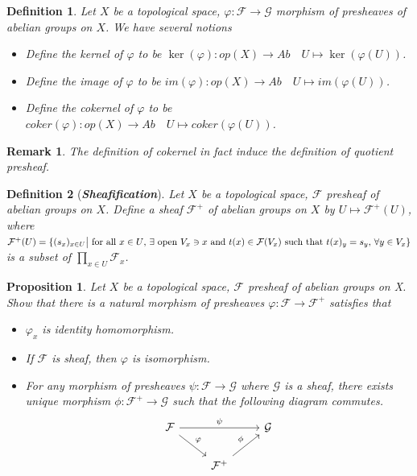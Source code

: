 \documentclass{ctexart}
\newtheorem{definition}{Definition}[section]
\newtheorem{remark}{Remark}[section]
\newtheorem{proposition}{Proposition}[section]
\begin{document}
\begin{definition}
    Let $X$ be a topological space, $\varphi: \mathcal{F} \longrightarrow \mathcal{G}$ morphism of presheaves of abelian groups on $X$.
    We have several notions
    \begin{itemize}
        \item Define the kernel of $\varphi$ to be $\ker(\varphi): op(X) \longrightarrow Ab\quad U \longmapsto \ker(\varphi(U))$.
        \item Define the image of $\varphi$ to be $im(\varphi): op(X) \longrightarrow Ab\quad U \longmapsto im(\varphi(U))$.
        \item Define the cokernel of $\varphi$ to be $coker(\varphi): op(X) \longrightarrow Ab\quad U \longmapsto coker(\varphi(U))$.
    \end{itemize}
\end{definition}
\begin{remark}
    The definition of cokernel in fact induce the definition of quotient presheaf.
\end{remark}
\begin{definition}[\textbf{\emph{Sheafification}}]
    Let $X$ be a topological space, $\mathcal{F}$ presheaf of abelian groups on $X$.
    Define a sheaf $\mathcal{F}^{+}$ of abelian groups on $X$ by $U \longmapsto \mathcal{F}^{+}(U)$, 
    where $\mathcal{F}^{+}(U) = \{(s_{x})_{x\in U} \big{|} \text{ for all $x\in U$, $\exists$ \text{open} $V_{x}\ni x$ and $t(x)\in \mathcal{F}(V_{x})$ such that $t(x)_{y} = s_{y}$, $\forall y\in V_{x}$}\}$ is a subset of $\prod_{x\in U} \mathcal{F}_{x}$.
\end{definition}
\begin{proposition}
    Let $X$ be a topological space, $\mathcal{F}$ presheaf of abelian groups on X.
    Show that there is a natural morphism of presheaves $\varphi: \mathcal{F} \longrightarrow \mathcal{F}^{+}$ satisfies that
    \begin{itemize}
        \item $\varphi_{x}$ is identity homomorphism.
        \item If $\mathcal{F}$ is sheaf, then $\varphi$ is isomorphism.
        \item For any morphism of presheaves $\psi: \mathcal{F} \longrightarrow \mathcal{G}$ where $\mathcal{G}$ is a sheaf,
        there exists unique morphism $\phi: \mathcal{F}^{+} \longrightarrow \mathcal{G}$ such that the following diagram commutes.
        \begin{equation}
            \begin{tikzcd}
                \mathcal{F} \arrow[rr, "\psi"] \arrow[dr, "\varphi"] &&
                \mathcal{G} \\
                & \mathcal{F}^{+} \arrow[ur, "\phi"] &
            \end{tikzcd}
        \end{equation}
    \end{itemize}
    \label{Proposition 1.3}
\end{proposition}
\end{document}

